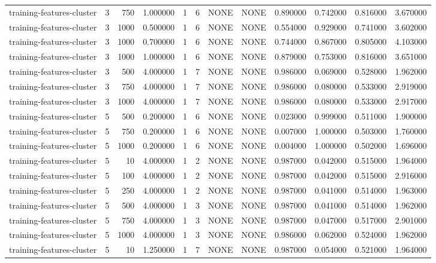 \begin{tabular}{lrrrllllrrrr}
training-features-cluster & 3 & 750 & 1.000000 & 1 & 6 & NONE & NONE & 0.890000 & 0.742000 & 0.816000 & 3.670000 \\
training-features-cluster & 3 & 1000 & 0.500000 & 1 & 6 & NONE & NONE & 0.554000 & 0.929000 & 0.741000 & 3.602000 \\
training-features-cluster & 3 & 1000 & 0.700000 & 1 & 6 & NONE & NONE & 0.744000 & 0.867000 & 0.805000 & 4.103000 \\
training-features-cluster & 3 & 1000 & 1.000000 & 1 & 6 & NONE & NONE & 0.879000 & 0.753000 & 0.816000 & 3.651000 \\
training-features-cluster & 3 & 500 & 4.000000 & 1 & 7 & NONE & NONE & 0.986000 & 0.069000 & 0.528000 & 1.962000 \\
training-features-cluster & 3 & 750 & 4.000000 & 1 & 7 & NONE & NONE & 0.986000 & 0.080000 & 0.533000 & 2.919000 \\
training-features-cluster & 3 & 1000 & 4.000000 & 1 & 7 & NONE & NONE & 0.986000 & 0.080000 & 0.533000 & 2.917000 \\
training-features-cluster & 5 & 500 & 0.200000 & 1 & 6 & NONE & NONE & 0.023000 & 0.999000 & 0.511000 & 1.900000 \\
training-features-cluster & 5 & 750 & 0.200000 & 1 & 6 & NONE & NONE & 0.007000 & 1.000000 & 0.503000 & 1.760000 \\
training-features-cluster & 5 & 1000 & 0.200000 & 1 & 6 & NONE & NONE & 0.004000 & 1.000000 & 0.502000 & 1.696000 \\
training-features-cluster & 5 & 10 & 4.000000 & 1 & 2 & NONE & NONE & 0.987000 & 0.042000 & 0.515000 & 1.964000 \\
training-features-cluster & 5 & 100 & 4.000000 & 1 & 2 & NONE & NONE & 0.987000 & 0.042000 & 0.515000 & 2.916000 \\
training-features-cluster & 5 & 250 & 4.000000 & 1 & 2 & NONE & NONE & 0.987000 & 0.041000 & 0.514000 & 1.963000 \\
training-features-cluster & 5 & 500 & 4.000000 & 1 & 3 & NONE & NONE & 0.987000 & 0.041000 & 0.514000 & 1.962000 \\
training-features-cluster & 5 & 750 & 4.000000 & 1 & 3 & NONE & NONE & 0.987000 & 0.047000 & 0.517000 & 2.901000 \\
training-features-cluster & 5 & 1000 & 4.000000 & 1 & 3 & NONE & NONE & 0.986000 & 0.062000 & 0.524000 & 1.962000 \\
training-features-cluster & 5 & 10 & 1.250000 & 1 & 7 & NONE & NONE & 0.987000 & 0.054000 & 0.521000 & 1.964000 \\

\end{tabular}
